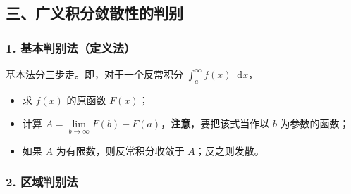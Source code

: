 \documentclass[a5paper]{ctexart}
\renewcommand{\d}{\mathop{}\!\mathrm{d}}
\begin{document}
	\subsection*{三、广义积分敛散性的判别}
	
	\subsubsection*{1. 基本判别法（定义法）}
	基本法分三步走。即，对于一个反常积分 $\int_{a}^{\infty} f(x) \d x$，
	\begin{itemize}
		\item 求 $f(x)$ 的原函数 $F(x)$；
		\item 计算 $A = \lim\limits_{b \to \infty} F(b) - F(a)$，\textbf{注意}，要把该式当作以 $b$ 为参数的函数；
		\item 如果 $A$ 为有限数，则反常积分收敛于 $A$；反之则发散。
	\end{itemize}
	
	\subsubsection*{2. 区域判别法}
	
\end{document}
